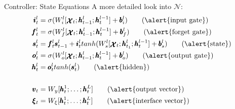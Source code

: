 \documentclass{beamer}
\newcommand{\xx}{\pmb{\raisebox{-1.5pt}{$\mathcal{X}$}}}
\newcommand{\hh}{\pmb{h}}
\newcommand{\ii}{\pmb{i}}
\newcommand{\oo}{\pmb{o}}
\newcommand{\ff}{\pmb{f}}
\newcommand{\Ss}{\pmb{s}}
\newcommand{\bb}{\pmb{b}}
\begin{document}
\begin{frame}{Controller: State Equations}
	A more detailed look into $\mathcal{N}$:\\
	\begin{align}
	\ii_t^l &= \sigma(W_i^l[\xx_t;\hh_{t-1}^l;\hh_t^{l-1}]+\bb_i^l)   \tag{\alert{input gate}}\\
	\ff_t^l &= \sigma(W_f^l[\xx_t;\hh_{t-1}^l;\hh_t^{l-1}]+\bb_f^l)	\tag{\alert{forget gate}}\\
	\Ss_t^l &= \ff_t^l\Ss_{t-1}^l + \ii_t^ltanh(W_s^l[\xx_t;\hh_{t_1}^l;\hh_t^{l-1}] + \bb_s^l)		\tag{\alert{state}}\\
	\oo_t^l &= \sigma(W_o^l[\xx_t;\hh_{t-1}^l;\hh_t^{l-1}]+\bb_o^l)		\tag{\alert{output gate}}\\
	\hh_t^l &= \oo_t^ltanh(\Ss_t^l)		\tag{\alert{hidden}}\\
	\nonumber \\ 
	\pmb{v}_t &= W_y[\hh_t^1;\dots;\hh_t^L]		\tag{\alert{output vector}}\\
	\pmb{\xi}_t &= W_{\xi}[\hh_t^1;\dots;\hh_t^L]		\tag{\alert{interface vector}}
	\end{align}
\end{frame}
\end{document}
